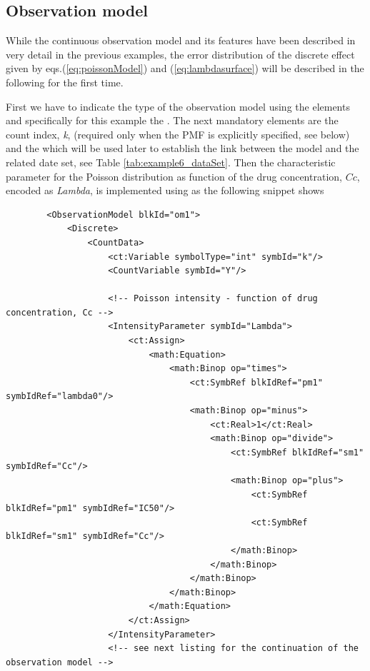 \subsection{Observation model}
While the continuous observation model and its features have been described 
in very detail in the previous examples, the error distribution of the discrete effect 
given by eqs.(\ref{eq:poissonModel}) 
and (\ref{eq:lambdasurface}) will be described in the following for the first time.

First we have to indicate the type of the observation model using the elements 
 and specifically for this example the . The next 
mandatory elements are the count index, \emph{k}, (required only when the PMF is 
explicitly specified, see below) and the  which will be used later
to establish the link between the model and the related date set, see Table 
\ref{tab:example6_dataSet}.
Then the characteristic parameter for the Poisson distribution as function of the drug 
concentration, $Cc$, encoded as \emph{Lambda}, is implemented using 
as the following snippet shows
\lstset{language=XML}
\begin{lstlisting}
        <ObservationModel blkId="om1">
            <Discrete>
                <CountData>
                    <ct:Variable symbolType="int" symbId="k"/>
                    <CountVariable symbId="Y"/>
                    
                    <!-- Poisson intensity - function of drug concentration, Cc -->                    
                    <IntensityParameter symbId="Lambda">
                        <ct:Assign>
                            <math:Equation>
                                <math:Binop op="times">
                                    <ct:SymbRef blkIdRef="pm1" symbIdRef="lambda0"/>
                                    <math:Binop op="minus">
                                        <ct:Real>1</ct:Real>
                                        <math:Binop op="divide">
                                            <ct:SymbRef blkIdRef="sm1" symbIdRef="Cc"/>
                                            <math:Binop op="plus">
                                                <ct:SymbRef blkIdRef="pm1" symbIdRef="IC50"/>
                                                <ct:SymbRef blkIdRef="sm1" symbIdRef="Cc"/>
                                            </math:Binop>
                                        </math:Binop>
                                    </math:Binop>
                                </math:Binop>
                            </math:Equation>
                        </ct:Assign>
                    </IntensityParameter>
                    <!-- see next listing for the continuation of the observation model -->
\end{lstlisting}
